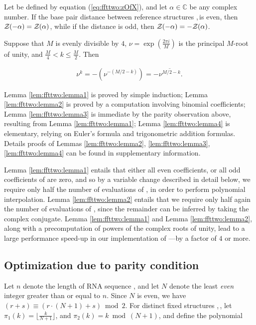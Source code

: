 \begin{lemma}
\label{lem:ffttwo:lemma3}
Let \emZ{} be defined by equation (\ref{eq:ffttwo:zOfX}), and
let $\alpha \in \mathbb{C}$ be any complex number.
If the base pair distance between reference
structures \strA,\,\strB is even, then ${\mathcal Z}_{}(-\alpha) = {\mathcal Z}_{}(\alpha)$,
while if
the distance is odd, then ${\mathcal Z}_{}(-\alpha) = -{\mathcal Z}_{}(\alpha)$.
\end{lemma}

\begin{lemma}
\label{lem:ffttwo:lemma4}
Suppose that $M$ is evenly divisible by $4$,
$\nu = \exp(\frac{2 \pi i}{M})$ is the principal $M$-root of unity, and
$\frac{M}{4} < k \leq \frac{M}{2}$. Then

\begin{align}
\nu^k = -(\nu^{-(M/2-k)}) = -\overline{\nu^{M/2-k}}.
\end{align}
\end{lemma}

Lemma \ref{lem:ffttwo:lemma1} is proved by simple induction;
Lemma \ref{lem:ffttwo:lemma2}
is proved by a computation involving binomial coefficients;
Lemma \ref{lem:ffttwo:lemma3} is immediate
by the parity observation above, resulting from Lemma \ref{lem:ffttwo:lemma1};
Lemma \ref{lem:ffttwo:lemma4} is elementary, relying on Euler's
formula and trigonometric addition formulas. Details proofs of
Lemmas \ref{lem:ffttwo:lemma2}, \ref{lem:ffttwo:lemma3}, \ref{lem:ffttwo:lemma4}
can be found in supplementary information.

Lemma \ref{lem:ffttwo:lemma1}
entails that either all even coefficients, or all odd coefficients
of \emZ{} are zero, and so by a variable change described in detail below,
we require only half the number of evaluations of \emZ{}, in order to perform
polynomial interpolation.
Lemma \ref{lem:ffttwo:lemma2}
 entails that we require only half again the number of evaluations of
\emZ{}, since the remainder can be inferred by taking the complex conjugate.
Lemma \ref{lem:ffttwo:lemma1} and Lemma \ref{lem:ffttwo:lemma2},
along with a
precomputation of powers of the complex roots of unity, lead to a
large performance speed-up in our implementation of \ffttwo---by a factor
of $4$ or more.

\subsection{Optimization due to parity condition}
\label{subsec:ffttwo:parity}

Let $n$ denote the length of RNA sequence \seq, and let $N$ denote the
least {\em even} integer greater than or equal to $n$. Since $N$ is even,
we have $(r+s) \equiv (r\cdot(N+1)+s) \bmod 2$. For distinct
fixed structures \strA,\,\strB, let
$\pi_1(k) = \lfloor \frac{k}{N+1} \rfloor$, and
$\pi_2(k) = k \bmod (N+1)$, and define the polynomial

